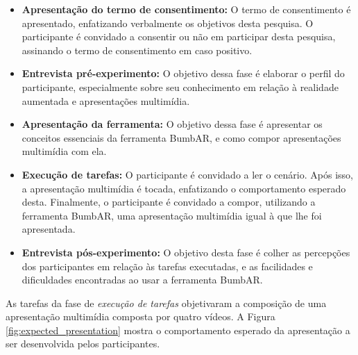 \documentclass[../main.tex]{subfiles}
\begin{document}
\begin{itemize}
    \item \textbf{Apresentação do termo de consentimento:} O termo de consentimento é a\-pre\-sen\-ta\-do, enfatizando verbalmente os objetivos desta pesquisa. O participante é convidado a consentir ou não em participar desta pesquisa, assinando o termo de consentimento em caso positivo.
    \item \textbf{Entrevista pré-experimento:} O objetivo dessa fase é elaborar o perfil do participante, especialmente sobre seu conhecimento em relação à realidade aumentada e apresentações multimídia.
    \item \textbf{Apresentação da ferramenta:} O objetivo dessa fase é apresentar os conceitos essenciais da ferramenta BumbAR, e como compor apresentações multimídia com ela.
    \item \textbf{Execução de tarefas:} O participante é convidado a ler o cenário. Após isso, a apresentação multimídia é tocada, enfatizando o comportamento esperado desta. Finalmente, o participante é convidado a compor, utilizando a ferramenta BumbAR, uma apresentação multimídia igual à que lhe foi apresentada.
    \item \textbf{Entrevista pós-experimento:} O objetivo desta fase é colher as percepções dos participantes em relação às tarefas executadas, e as facilidades e dificuldades encontradas ao usar a ferramenta BumbAR.
\end{itemize}

As tarefas da fase de \emph{execução de tarefas} objetivaram a composição de uma apresentação multimídia composta por quatro vídeos. A Figura \ref{fig:expected_presentation} mostra o comportamento esperado da apresentação a ser desenvolvida pelos participantes.
\end{document}
